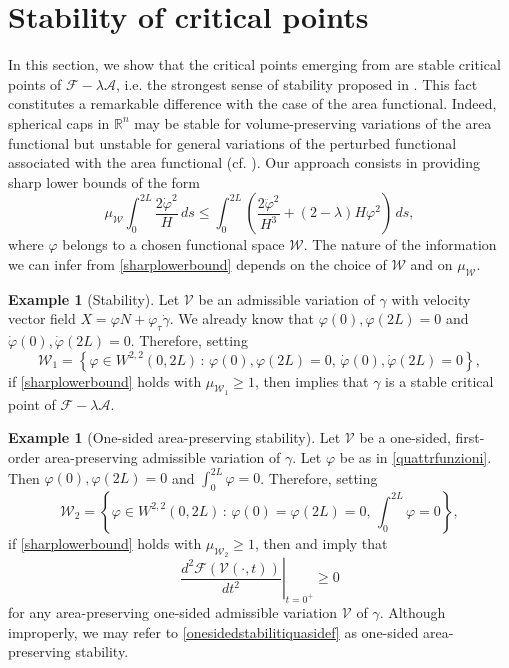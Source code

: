 \documentclass[11pt]{amsart}
\renewcommand{\leq}{\leqslant}
\renewcommand{\geq}{\geqslant}
\newcommand{\A}{\mathcal A}
\newcommand{\F}{\mathcal F}
\newcommand{\rr}{{\mathbb{R}}}
\theoremstyle{definition}
\newtheorem{example}[theorem]{Example}
\theoremstyle{remark}
\numberwithin{equation}{section}
\begin{document}
\section{Stability of critical points}\label{sec_stability}
In this section, we show that the critical points emerging from  are stable critical points of $\F-\lambda\A$, i.e. the strongest sense of stability proposed in . This fact constitutes a remarkable difference with the case of the area functional. Indeed, spherical caps in $\rr^{n}$ may be stable for volume-preserving variations of the area functional but unstable for general variations of the perturbed functional associated with the area functional (cf. \cite{MR731682}). Our approach consists in providing sharp lower bounds of the form
\begin{equation}\label{sharplowerbound}
\mu_{\mathcal W}\int_0^{2L}\frac{2\dot\varphi^2}{H}\,ds\leq \int_0^{2L}\left(\frac{2\ddot\varphi^2}{H^3}+(2-\lambda)H \varphi^2\right)\,ds,
\end{equation}
where $\varphi$ belongs to a chosen functional space $\mathcal W$. The nature of the information we can infer from \eqref{sharplowerbound} depends on the choice of $\mathcal W$ and on $\mu_\mathcal W$.
\begin{example}[Stability]\label{examplestability}
Let $\mathcal V$ be an admissible variation of $\gamma$ with velocity vector field $X=\varphi N+\varphi_\tau\dot\gamma$. We already know that $\varphi(0),\varphi(2L)=0$ and $\dot\varphi(0),\dot\varphi(2L)=0$. Therefore, setting 
\begin{equation*}
	\mathcal W_1=\left\{\varphi\in W^{2,2}(0,2L)\,:\,\varphi(0),\varphi(2L)=0,\,\dot\varphi(0),\dot\varphi(2L)=0\right\},
\end{equation*}
if \eqref{sharplowerbound} holds with $\mu_{\mathcal W_1}\geq 1$, then  implies that $\gamma$ is a stable critical point of $\F-\lambda\A$.
\end{example}
\begin{example}[One-sided area-preserving stability]\label{onesidedexample}
Let $\mathcal V$ be a one-sided, first-order area-preserving admissible variation of $\gamma$. Let $\varphi$ be as in \eqref{quattrfunzioni}. Then $\varphi(0),\varphi(2L)=0$ and $\int_0^{2L}\varphi=0$. Therefore, setting 
\begin{equation*}
	\mathcal W_2=\left\{\varphi\in W^{2,2}(0,2L)\,:\,\varphi(0)=\varphi(2L)=0,\,\int_0^{2L}\varphi=0\right\},
\end{equation*}
if \eqref{sharplowerbound} holds with $\mu_{\mathcal W_2}\geq 1$, then  and  imply that  \begin{equation}\label{onesidedstabilitiquasidef}
	\left.\frac{d^2\F(\mathcal V(\cdot,t))}{dt^2}\right|_{t=0^+}\geq 0
\end{equation}
for any area-preserving one-sided admissible variation $\mathcal V$ of $\gamma$. Although improperly, we may refer to \eqref{onesidedstabilitiquasidef} as one-sided area-preserving stability.
\end{example}
\end{document}
